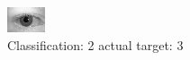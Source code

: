 \begin{figure}[h!]
\begin{center}
\includegraphics[width=0.60\columnwidth]{figures/ID617_class_2_target_3.png}
\end{center}
\caption{ Classification: 2 actual target: 3}
\label{fig:ID617_class_2_target_3}
\end{figure}
